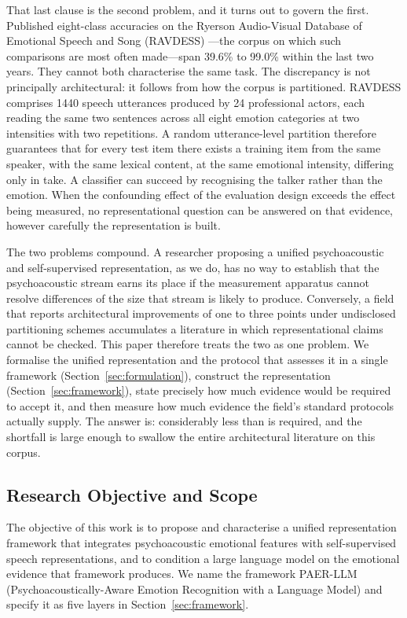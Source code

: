 \documentclass[journal,onecolumn,11pt,draftclsnofoot]{IEEEtran}   %
\begin{document}
That last clause is the second problem, and it turns out to govern the first.
Published eight-class accuracies on the Ryerson Audio-Visual Database of
Emotional Speech and Song (RAVDESS) \cite{livingstone2018ravdess}---the corpus
on which such comparisons are most often made---span 39.6\%
\cite{goel2024camulenet} to 99.0\% \cite{jafarzadeh2024ssl} within the last two
years. They cannot both characterise the same task. The discrepancy is not
principally architectural: it follows from how the corpus is partitioned.
RAVDESS comprises 1440 speech utterances produced by 24 professional actors,
each reading the same two sentences across all eight emotion categories at two
intensities with two repetitions. A random utterance-level partition therefore
guarantees that for every test item there exists a training item from the same
speaker, with the same lexical content, at the same emotional intensity,
differing only in take. A classifier can succeed by recognising the talker
rather than the emotion. When the confounding effect of the evaluation design
exceeds the effect being measured, no representational question can be answered
on that evidence, however carefully the representation is built.

The two problems compound. A researcher proposing a unified psychoacoustic and
self-supervised representation, as we do, has no way to establish that the
psychoacoustic stream earns its place if the measurement apparatus cannot
resolve differences of the size that stream is likely to produce. Conversely, a
field that reports architectural improvements of one to three points under
undisclosed partitioning schemes accumulates a literature in which
representational claims cannot be checked. This paper therefore treats the two
as one problem. We formalise the unified representation and the protocol that
assesses it in a single framework (Section~\ref{sec:formulation}), construct the
representation (Section~\ref{sec:framework}), state precisely how much evidence
would be required to accept it, and then measure how much evidence the field's
standard protocols actually supply. The answer is: considerably less than is
required, and the shortfall is large enough to swallow the entire architectural
literature on this corpus.

\subsection{Research Objective and Scope}
\label{sec:objective}

The objective of this work is to propose and characterise a unified
representation framework that integrates psychoacoustic emotional features with
self-supervised speech representations, and to condition a large language model
on the emotional evidence that framework produces. We name the framework
PAER-LLM (Psychoacoustically-Aware Emotion Recognition with a Language Model)
and specify it as five layers in Section~\ref{sec:framework}.
\end{document}
